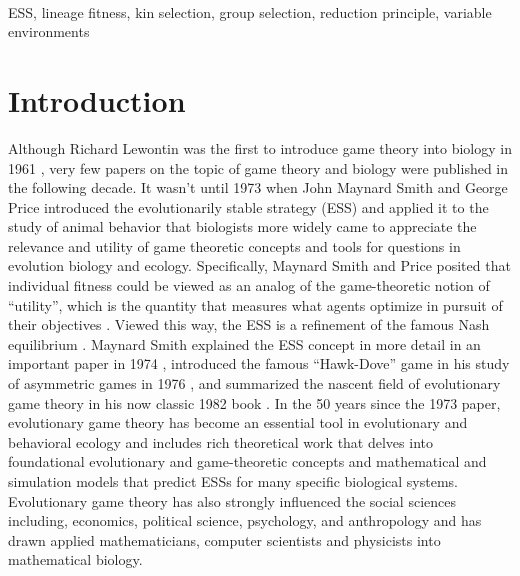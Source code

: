 \documentclass[11pt]{article}
\begin{document}
\vspace{3em}
\\
ESS, lineage fitness, kin selection, group selection, reduction principle, variable environments

\clearpage
\section{Introduction}

Although Richard Lewontin was the first to introduce game theory into biology in 1961 \cite{Lewontin:1961}, very few papers on the topic of game theory and biology were published in the following decade. It wasn't until 1973 when John Maynard Smith and George Price introduced the evolutionarily stable strategy (ESS) and applied it to the study of animal behavior \cite{Maynard-Smith:Price:1973} that biologists more widely came to appreciate the relevance and utility of game theoretic concepts and tools for questions in evolution biology and ecology. Specifically, Maynard Smith and Price posited that individual fitness could be viewed as an analog of the game-theoretic notion of ``utility'', which is the quantity that measures what agents optimize in pursuit of their objectives \cite{Myerson:1991}. Viewed this way, the ESS is a refinement of the famous Nash equilibrium \cite{Nash:1950}. Maynard Smith explained the ESS concept in more detail in an important paper in 1974 \cite{Maynard-Smith:1974}, introduced the famous ``Hawk-Dove'' game in his study of asymmetric games in 1976 \cite{Maynard-Smith:Parker:1976}, and summarized the nascent field of evolutionary game theory in his now classic 1982 book \cite{MaynardSmith:1982}. In the 50 years since the 1973 paper, evolutionary game theory has become an essential tool in evolutionary and behavioral ecology and includes rich theoretical work that delves into foundational evolutionary and game-theoretic concepts and mathematical and simulation models that predict ESSs for many specific biological systems. Evolutionary game theory has also strongly influenced the social sciences including, economics, political science, psychology, and anthropology and has drawn applied mathematicians, computer scientists and physicists into mathematical biology.
\end{document}
